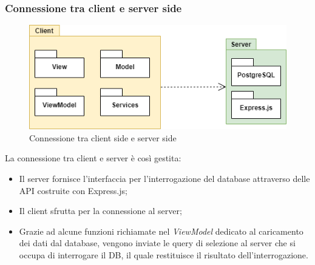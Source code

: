 \newpage
\subsubsection{Connessione tra client e server side}
\begin{figure}[hb]
\includegraphics[width=12cm]{Images/Allegato Tecnico-Package 2}
\centering
\caption{Connessione tra client side e server side}
\end{figure}
La connessione tra client e server è così gestita:
\begin{itemize}
	\item Il server fornisce l'interfaccia per l'interrogazione del database attraverso delle API costruite con Express.js;
	\item Il client sfrutta  per la connessione al server;
	\item Grazie ad alcune funzioni richiamate nel \textit{ViewModel} dedicato al caricamento dei dati dal database, vengono inviate le query di selezione al server che si occupa di interrogare il DB, il quale restituisce il risultato dell'interrogazione.
\end{itemize}